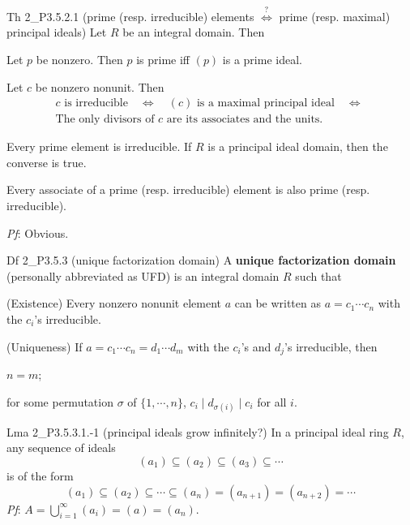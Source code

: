 \documentclass{article}
\begin{document}
\begin{Th}{Th 2\_P3.5.2.1 (prime (resp. irreducible) elements $\overset{?}{\Longleftrightarrow}$ prime (resp. maximal) principal ideals)}
    Let $R$ be an integral domain. Then
    \begin{compactenum}
        \item Let $p$ be nonzero. Then $p$ is prime iff $(p)$ is a prime ideal.
        \item Let $c$ be nonzero nonunit. Then 
        $$ \begin{aligned}
            & c \text{ is irreducible} \quad\Longleftrightarrow\quad (c) \text{ is a maximal principal ideal} \quad\Longleftrightarrow\quad \\
            & \text{The only divisors of } c \text{ are its associates and the units.}
        \end{aligned} $$
        \item Every prime element is irreducible. If $R$ is a principal ideal domain, then the converse is true.
        \item Every associate of a prime (resp. irreducible) element is also prime (resp. irreducible).
    \end{compactenum}
    \tcblower
    \textit{Pf}: Obvious.
\end{Th}

\begin{Df}{Df 2\_P3.5.3 (unique factorization domain)}
    A \textbf{unique factorization domain} (personally abbreviated as UFD) is an integral domain $R$ such that
    \begin{compactenum}
        \item (Existence) Every nonzero nonunit element $a$ can be written as $a=c_1\cdots c_n$ with the $c_i$'s irreducible.
        \item (Uniqueness) If $a=c_1\cdots c_n=d_1\cdots d_m$ with the $c_i$'s and $d_j$'s irreducible, then
        \begin{compactenum}
            \item $n=m$;
            \item for some permutation $\sigma$ of $\{1,\cdots,n\}$, \quad $c_i\mid d_{\sigma(i)}\mid c_i$ for all $i$.
        \end{compactenum}
    \end{compactenum}
\end{Df}

\begin{Th}{Lma 2\_P3.5.3.1.-1 (principal ideals grow infinitely?)}
    In a principal ideal ring $R$, any sequence of ideals
    $$ (a_1)\subseteq (a_2)\subseteq (a_3)\subseteq \cdots $$
    is of the form
    $$ (a_1)\subseteq (a_2)\subseteq \cdots \subseteq (a_n)=(a_{n+1})=(a_{n+2})=\cdots $$
    \tcblower
    \textit{Pf}: $A = \bigcup_{i=1}^{\infty} (a_i) = (a) = (a_n)$.
\end{Th}
\end{document}
